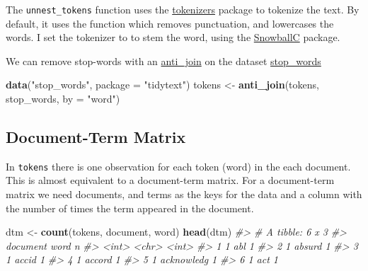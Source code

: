 \documentclass[]{book}
\newenvironment{Shaded}{\begin{snugshade}}{\end{snugshade}}
\newcommand{\CommentTok}[1]{\textcolor[rgb]{0.56,0.35,0.01}{\textit{#1}}}
\newcommand{\DataTypeTok}[1]{\textcolor[rgb]{0.13,0.29,0.53}{#1}}
\newcommand{\KeywordTok}[1]{\textcolor[rgb]{0.13,0.29,0.53}{\textbf{#1}}}
\newcommand{\NormalTok}[1]{#1}
\newcommand{\StringTok}[1]{\textcolor[rgb]{0.31,0.60,0.02}{#1}}
\theoremstyle{definition}
\theoremstyle{definition}
\theoremstyle{definition}
\theoremstyle{remark}
\begin{document}
The \texttt{unnest\_tokens} function uses the
\href{https://cran.r-project.org/package=tokenizers}{tokenizers} package
to tokenize the text. By default, it uses the function which removes
punctuation, and lowercases the words. I set the tokenizer to to stem
the word, using the
\href{https://cran.r-project.org/package=SnowballC}{SnowballC} package.

We can remove stop-words with an
\href{https://www.rdocumentation.org/packages/dplyr/topics/anti_join}{anti\_join}
on the dataset
\href{https://www.rdocumentation.org/packages/tidytext/topics/stop_words}{stop\_words}

\begin{Shaded}
\begin{Highlighting}[]
\KeywordTok{data}\NormalTok{(}\StringTok{"stop_words"}\NormalTok{, }\DataTypeTok{package =} \StringTok{"tidytext"}\NormalTok{)}
\NormalTok{tokens <-}\StringTok{ }\KeywordTok{anti_join}\NormalTok{(tokens, stop_words, }\DataTypeTok{by =} \StringTok{"word"}\NormalTok{)}
\end{Highlighting}
\end{Shaded}

\hypertarget{document-term-matrix}{%
\subsection{Document-Term Matrix}\label{document-term-matrix}}

In \texttt{tokens} there is one observation for each token (word) in the
each document. This is almost equivalent to a document-term matrix. For
a document-term matrix we need documents, and terms as the keys for the
data and a column with the number of times the term appeared in the
document.

\begin{Shaded}
\begin{Highlighting}[]
\NormalTok{dtm <-}\StringTok{ }\KeywordTok{count}\NormalTok{(tokens, document, word)}
\KeywordTok{head}\NormalTok{(dtm)}
\CommentTok{#> # A tibble: 6 x 3}
\CommentTok{#>   document word           n}
\CommentTok{#>      <int> <chr>      <int>}
\CommentTok{#> 1        1 abl            1}
\CommentTok{#> 2        1 absurd         1}
\CommentTok{#> 3        1 accid          1}
\CommentTok{#> 4        1 accord         1}
\CommentTok{#> 5        1 acknowledg     1}
\CommentTok{#> 6        1 act            1}
\end{Highlighting}
\end{Shaded}
\end{document}
